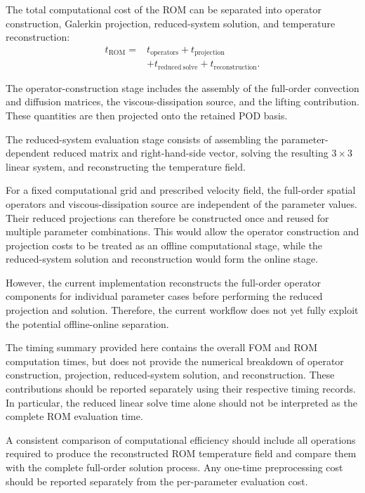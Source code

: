 The total computational cost of the ROM can be
separated into operator construction, Galerkin
projection, reduced-system solution, and temperature
reconstruction:
\[
\begin{aligned}
t_{\mathrm{ROM}}
={}&t_{\mathrm{operators}}
+t_{\mathrm{projection}}\\
&+t_{\mathrm{reduced\ solve}}
+t_{\mathrm{reconstruction}}.
\end{aligned}
\]

The operator-construction stage includes the assembly
of the full-order convection and diffusion matrices,
the viscous-dissipation source, and the lifting
contribution. These quantities are then projected
onto the retained POD basis.

The reduced-system evaluation stage consists of
assembling the parameter-dependent reduced matrix
and right-hand-side vector, solving the resulting
$3\times3$ linear system, and reconstructing the
temperature field.

For a fixed computational grid and prescribed
velocity field, the full-order spatial operators
and viscous-dissipation source are independent of
the parameter values. Their reduced projections
can therefore be constructed once and reused for
multiple parameter combinations. This would allow
the operator construction and projection costs to
be treated as an offline computational stage,
while the reduced-system solution and reconstruction
would form the online stage.

However, the current implementation reconstructs
the full-order operator components for individual
parameter cases before performing the reduced
projection and solution. Therefore, the current
workflow does not yet fully exploit the potential
offline-online separation.

The timing summary provided here contains the
overall FOM and ROM computation times, but does
not provide the numerical breakdown of operator
construction, projection, reduced-system solution,
and reconstruction. These contributions should
be reported separately using their respective
timing records. In particular, the reduced linear
solve time alone should not be interpreted as the
complete ROM evaluation time.

A consistent comparison of computational
efficiency should include all operations required
to produce the reconstructed ROM temperature
field and compare them with the complete
full-order solution process. Any one-time
preprocessing cost should be reported separately
from the per-parameter evaluation cost.

